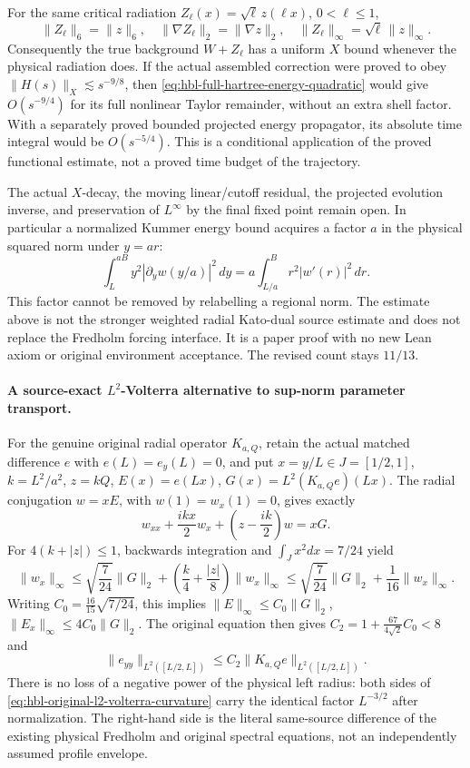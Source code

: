 \documentclass[11pt]{amsart}
\begin{document}
For the same critical radiation
\(Z_\ell(x)=\sqrt\ell\,z(\ell x)\), \(0<\ell\le1\),
\[
 \|Z_\ell\|_6=\|z\|_6,\quad
 \|\nabla Z_\ell\|_2=\|\nabla z\|_2,\quad
 \|Z_\ell\|_\infty=\sqrt\ell\,\|z\|_\infty.
\]
Consequently the true background \(W+Z_\ell\) has a uniform
\(X\) bound whenever the physical radiation does.  If the actual
assembled correction were proved to obey
\(\|H(s)\|_X\lesssim s^{-9/8}\), then
\eqref{eq:hbl-full-hartree-energy-quadratic} would give
\(O(s^{-9/4})\) for its full nonlinear Taylor remainder, without
an extra shell factor.  With a separately proved bounded projected
energy propagator, its absolute time integral would be
\(O(s^{-5/4})\).  This is a conditional application of the
proved functional estimate, not a proved time budget of the trajectory.

The actual \(X\)-decay, the moving linear/cutoff residual, the projected
evolution inverse, and preservation of \(L^\infty\) by the final fixed
point remain open.  In particular a normalized Kummer energy bound
acquires a factor \(a\) in the physical squared norm under \(y=ar\):
\[
 \int_L^{aB}y^2|\partial_y w(y/a)|^2\,dy
  =a\int_{L/a}^B r^2|w'(r)|^2\,dr.
\]
This factor cannot be removed by relabelling a regional norm.
The estimate above is not the stronger weighted radial Kato-dual source
estimate and does not replace the Fredholm forcing interface.
It is a paper proof with no new Lean axiom or original environment
acceptance.  The revised count stays \(11/13\).



\paragraph{A source-exact \(L^2\)-Volterra alternative to sup-norm parameter transport.}
For the genuine original radial operator \(K_{a,Q}\), retain the actual
matched difference \(e\) with \(e(L)=e_y(L)=0\), and put
\(x=y/L\in J=[1/2,1]\), \(k=L^2/a^2\), \(z=kQ\),
\(E(x)=e(Lx)\), \(G(x)=L^2(K_{a,Q}e)(Lx)\).
The radial conjugation \(w=xE\), with \(w(1)=w_x(1)=0\),
gives exactly
\[
w_{xx}+\frac{ikx}{2}w_x+
\left(z-\frac{ik}{2}\right)w=xG.
\]
For \(4(k+|z|)\le1\), backwards integration and
\(\int_Jx^2dx=7/24\) yield
\[
\|w_x\|_\infty\le\sqrt{\frac7{24}}\|G\|_2+
\left(\frac k4+\frac{|z|}8\right)\|w_x\|_\infty
\le\sqrt{\frac7{24}}\|G\|_2+\frac1{16}\|w_x\|_\infty.
\]
Writing \(C_0=\frac{16}{15}\sqrt{7/24}\), this implies
\(\|E\|_\infty\le C_0\|G\|_2\),
\(\|E_x\|_\infty\le4C_0\|G\|_2\). The original equation
then gives \(C_2=1+\frac{67}{4\sqrt2}C_0<8\) and
\begin{equation}
\|e_{yy}\|_{L^2([L/2,L])}
\le C_2\|K_{a,Q}e\|_{L^2([L/2,L])}.
\label{eq:hbl-original-l2-volterra-curvature}
\end{equation}
There is no loss of a negative power of the physical left radius:
both sides of \eqref{eq:hbl-original-l2-volterra-curvature}
carry the identical factor \(L^{-3/2}\) after normalization.
The right-hand side is the literal same-source difference of
the existing physical Fredholm and original spectral equations,
not an independently assumed profile envelope.
\end{document}
